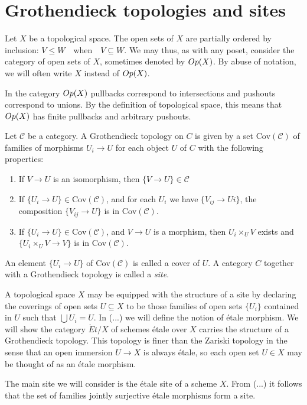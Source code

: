 \section{Grothendieck topologies and sites}
\begin{construction}[h]\label{def:opens}
  Let $X$ be a topological space. The open sets of $X$ are partially ordered by inclusion: $V \le W \quad \text{when} \quad V \subseteq W$.  We may thus, as with any poset, consider the category of open sets of $X$, sometimes denoted by $Op(X)$. By abuse of notation, we will often write $X$ instead of $Op(X)$.
\end{construction}
\begin{remark}
 In the category $Op(X)$ pullbacks correspond to intersections and pushouts correspond to unions. By the definition of topological space, this means that $Op(X)$ has finite pullbacks and arbitrary pushouts. 
\end{remark}

\begin{definition}
	Let $\mathcal{C}$ be a category. A Grothendieck topology on $C$ is given by a set $\text{Cov}(\mathcal{C})$ of families of morphisms ${U_i \to U}$ for each object $U$ of $C$ with the following properties:
	\begin{enumerate}
		\item If $V \to U$ is an isomorphism, then $\{V \to U\} \in \mathcal{C}$
		\item If $\{U_i \to U\} \in \text{Cov}(\mathcal{C})$, and for each $U_i$ we have $\{V_{ij} \to Ui\}$, the composition $\{V_{ij} \to U\}$ is in $\text{Cov}(\mathcal{C})$.
		\item If $\{U_i \to U\} \in \text{Cov}(\mathcal{C})$, and $V \to U$ is a morphism, then $U_i \times_U V$ exists and 
		$\{U_i \times_U V \to V\}$ is in $\text{Cov}(\mathcal{C})$.
	\end{enumerate}	
	An element $\{U_i \to U\}$ of $\text{Cov}(\mathcal{C})$ is called a cover of $U$. A category $C$ together with a Grothendieck topology is called a \textit{site}.
\end{definition}

\begin{remark}
	A topological space $X$ may be equipped with the structure of a site by declaring the coverings of open sets $U \subseteq X$ to be those families of open sets $\{U_i\}$ contained in $U$ such that $\bigcup U_i = U$.  In (...) we will define the notion of \'etale morphism. We will show the category $\acute{E}t/X$ of schemes \'etale over $X$ carries the structure of a Grothendieck topology. This topology is finer than the Zariski topology in the sense that an open immersion $U \to X$ is always \'etale, so each open set $U \in X$ may be thought of as an \'etale morphism.
\end{remark}
\begin{remark}
	The main site we will consider is the \'etale site of a scheme $X$. From (...) it follows that the set of families jointly surjective \'etale morphisms form a site.
\end{remark}


